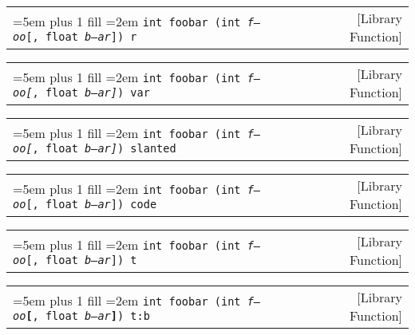 \documentclass{book}
\newcommand\GNUTexinfocommandstyletextvar[1]{{\normalfont{}\textsl{#1}}}%
\begin{document}
%

\noindent\begin{tabularx}{\linewidth}{@{}Xr}
\rightskip=5em plus 1 fill
\hangindent=2em
\noindent\texttt{int foobar (int\ \GNUTexinfocommandstyletextvar{f---oo}\textnormal{[},\ float\ \GNUTexinfocommandstyletextvar{b--ar}\textnormal{]})\ r}& [Library Function]
\end{tabularx}

%

\noindent\begin{tabularx}{\linewidth}{@{}Xr}
\rightskip=5em plus 1 fill
\hangindent=2em
\noindent\texttt{int foobar (int\ \GNUTexinfocommandstyletextvar{f---oo}\GNUTexinfocommandstyletextvar{[},\ float\ \GNUTexinfocommandstyletextvar{b--ar}\GNUTexinfocommandstyletextvar{]})\ var}& [Library Function]
\end{tabularx}

%

\noindent\begin{tabularx}{\linewidth}{@{}Xr}
\rightskip=5em plus 1 fill
\hangindent=2em
\noindent\texttt{int foobar (int\ \GNUTexinfocommandstyletextvar{f---oo}\textsl{[},\ float\ \GNUTexinfocommandstyletextvar{b--ar}\textsl{]})\ slanted}& [Library Function]
\end{tabularx}

%

\noindent\begin{tabularx}{\linewidth}{@{}Xr}
\rightskip=5em plus 1 fill
\hangindent=2em
\noindent\texttt{int foobar (int\ \GNUTexinfocommandstyletextvar{f---oo}\texttt{[},\ float\ \GNUTexinfocommandstyletextvar{b--ar}\texttt{]})\ code}& [Library Function]
\end{tabularx}

%

\noindent\begin{tabularx}{\linewidth}{@{}Xr}
\rightskip=5em plus 1 fill
\hangindent=2em
\noindent\texttt{int foobar (int\ \GNUTexinfocommandstyletextvar{f---oo}\texttt{[},\ float\ \GNUTexinfocommandstyletextvar{b--ar}\texttt{]})\ t}& [Library Function]
\end{tabularx}

%

\noindent\begin{tabularx}{\linewidth}{@{}Xr}
\rightskip=5em plus 1 fill
\hangindent=2em
\noindent\texttt{int foobar (int\ \GNUTexinfocommandstyletextvar{f---oo}\texttt{\textbf{[}},\ float\ \GNUTexinfocommandstyletextvar{b--ar}\texttt{\textbf{]}})\ t:b}& [Library Function]
\end{tabularx}
\end{document}
